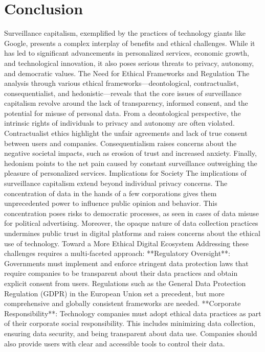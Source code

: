 
\section{Conclusion}\label{sec:conclusion}
Surveillance capitalism, exemplified by the practices of technology giants like Google, presents a complex interplay of benefits and ethical challenges.
While it has led to significant advancements in personalized services, economic growth, and technological innovation, it also poses serious threats to privacy, autonomy, and democratic values.
The Need for Ethical Frameworks and Regulation
The analysis through various ethical frameworks—deontological, contractualist, consequentialist, and hedonistic—reveals that the core issues of surveillance capitalism revolve around the lack of transparency, informed consent, and the potential for misuse of personal data.
From a deontological perspective, the intrinsic rights of individuals to privacy and autonomy are often violated.
Contractualist ethics highlight the unfair agreements and lack of true consent between users and companies.
Consequentialism raises concerns about the negative societal impacts, such as erosion of trust and increased anxiety.
Finally, hedonism points to the net pain caused by constant surveillance outweighing the pleasure of personalized services.
Implications for Society
The implications of surveillance capitalism extend beyond individual privacy concerns.
The concentration of data in the hands of a few corporations gives them unprecedented power to influence public opinion and behavior.
This concentration poses risks to democratic processes, as seen in cases of data misuse for political advertising.
Moreover, the opaque nature of data collection practices undermines public trust in digital platforms and raises concerns about the ethical use of technology.
Toward a More Ethical Digital Ecosystem
Addressing these challenges requires a multi-faceted approach:
**Regulatory Oversight**: Governments must implement and enforce stringent data protection laws that require companies to be transparent about their data practices and obtain explicit consent from users.
Regulations such as the General Data Protection Regulation (GDPR) in the European Union set a precedent, but more comprehensive and globally consistent frameworks are needed.
**Corporate Responsibility**: Technology companies must adopt ethical data practices as part of their corporate social responsibility.
This includes minimizing data collection, ensuring data security, and being transparent about data use.
Companies should also provide users with clear and accessible tools to control their data.
